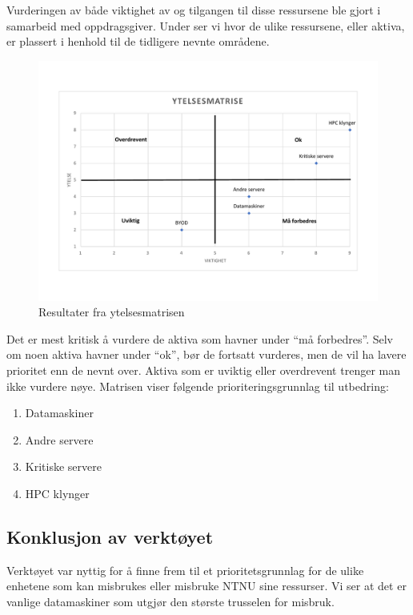Vurderingen av både viktighet av og tilgangen til disse ressursene ble gjort i samarbeid med oppdragsgiver. Under ser vi hvor de ulike ressursene, eller aktiva, er plassert i henhold til de tidligere nevnte områdene.
\begin{figure}[H]
    \centering
    \includegraphics[scale=0.5]{case_3/bilder/ytelsesmatrise.pdf}
    \caption[Ytelsesmatrise]{Resultater fra ytelsesmatrisen}
    \label{fig:ytelsesmatrise}
\end{figure}
Det er mest kritisk å vurdere de aktiva som havner under ``må forbedres''. Selv om noen aktiva havner under ``ok'', bør de fortsatt vurderes, men de vil ha lavere prioritet enn de nevnt over. Aktiva som er uviktig eller overdrevent trenger man ikke vurdere nøye. Matrisen viser følgende prioriteringsgrunnlag til utbedring:

\begin{enumerate}
    \item Datamaskiner
    \item Andre servere
    \item Kritiske servere
    \item HPC klynger
\end{enumerate}

\subsection{Konklusjon av verktøyet}
Verktøyet var nyttig for å finne frem til et prioritetsgrunnlag for de ulike enhetene som kan misbrukes eller misbruke NTNU sine ressurser. Vi ser at det er vanlige datamaskiner som utgjør den største trusselen for misbruk. 